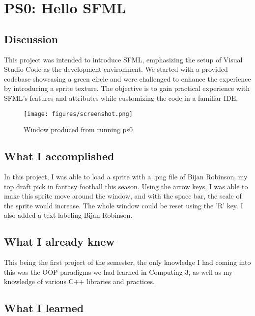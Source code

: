 \section{PS0: Hello SFML}\label{sec:ps0}

\subsection{Discussion}\label{sec:ps0:disc}

This project was intended to introduce SFML, emphasizing the setup of Visual Studio Code as the development environment. We started with a provided codebase showcasing a green circle and were challenged to enhance the experience by introducing a sprite texture. The objective is to gain practical experience with SFML's features and attributes while customizing the code in a familiar IDE.


\begin{figure}[tbh]
	\centering
	\texttt{[image: figures/screenshot.png]}
	\caption{Window produced from running ps0}\label{fig:Hello}
\end{figure}


\subsection{What I accomplished}\label{sec:ps0:accomplish}

In this project, I was able to load a sprite with a .png file of Bijan Robinson, my top draft pick in fantasy football this season. Using the arrow keys, I was able to make this sprite move around the window, and with the space bar, the scale of the sprite would increase. The whole window could be reset using the 'R' key. I also added a text labeling Bijan Robinson.

\subsection{What I already knew}\label{sec:ps0:knew}

This being the first project of the semester, the only knowledge I had coming into this was the OOP paradigms we had learned in Computing 3, as well as my knowledge of various C++ libraries and practices.

\subsection{What I learned}\label{sec:ps0:learned}

